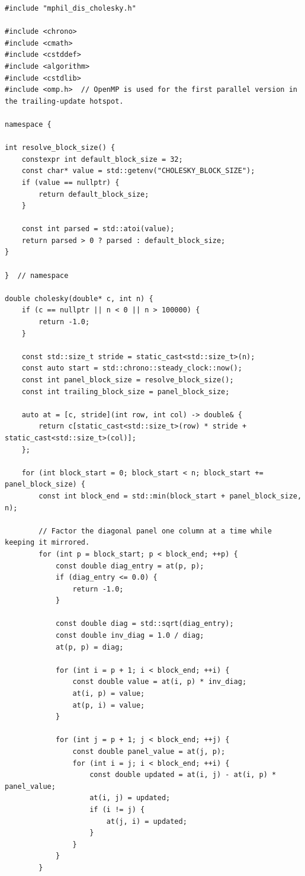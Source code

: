 \begin{lstlisting}[style=appendixcode]
#include "mphil_dis_cholesky.h"

#include <chrono>
#include <cmath>
#include <cstddef>
#include <algorithm>
#include <cstdlib>
#include <omp.h>  // OpenMP is used for the first parallel version in the trailing-update hotspot.

namespace {

int resolve_block_size() {
    constexpr int default_block_size = 32;
    const char* value = std::getenv("CHOLESKY_BLOCK_SIZE");
    if (value == nullptr) {
        return default_block_size;
    }

    const int parsed = std::atoi(value);
    return parsed > 0 ? parsed : default_block_size;
}

}  // namespace

double cholesky(double* c, int n) {
    if (c == nullptr || n < 0 || n > 100000) {
        return -1.0;
    }

    const std::size_t stride = static_cast<std::size_t>(n);
    const auto start = std::chrono::steady_clock::now();
    const int panel_block_size = resolve_block_size();
    const int trailing_block_size = panel_block_size;

    auto at = [c, stride](int row, int col) -> double& {
        return c[static_cast<std::size_t>(row) * stride + static_cast<std::size_t>(col)];
    };

    for (int block_start = 0; block_start < n; block_start += panel_block_size) {
        const int block_end = std::min(block_start + panel_block_size, n);

        // Factor the diagonal panel one column at a time while keeping it mirrored.
        for (int p = block_start; p < block_end; ++p) {
            const double diag_entry = at(p, p);
            if (diag_entry <= 0.0) {
                return -1.0;
            }

            const double diag = std::sqrt(diag_entry);
            const double inv_diag = 1.0 / diag;
            at(p, p) = diag;

            for (int i = p + 1; i < block_end; ++i) {
                const double value = at(i, p) * inv_diag;
                at(i, p) = value;
                at(p, i) = value;
            }

            for (int j = p + 1; j < block_end; ++j) {
                const double panel_value = at(j, p);
                for (int i = j; i < block_end; ++i) {
                    const double updated = at(i, j) - at(i, p) * panel_value;
                    at(i, j) = updated;
                    if (i != j) {
                        at(j, i) = updated;
                    }
                }
            }
        }


\end{lstlisting}
